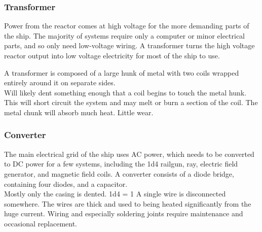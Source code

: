 \documentclass[a4paper]{article}
\begin{document}
\vspace{-0.5cm} \hspace{-18pt} \subsubsection{Transformer} \label{grid_transformer} \vspace{-0.2cm}
Power from the reactor comes at high voltage for the more demanding parts of the ship. The majority of systems require only a computer or minor electrical parts, and so only need low-voltage wiring. A transformer turns the high voltage reactor output into low voltage electricity for most of the ship to use.

A transformer is composed of a large hunk of metal with two coils wrapped entirely around it on separate sides. 
\\ \pbhw
{}
{Will likely dent something enough that a coil begins to touch the metal hunk. This will short circuit the system and may melt or burn a section of the coil.}
{The metal chunk will absorb much heat.}
{Little wear.}


\vspace{-0.5cm} \hspace{-18pt} \subsubsection{Converter} \label{grid_converter} \vspace{-0.2cm}
The main electrical grid of the ship uses AC power, which needs to be converted to DC power for a few systems, including the 1d4 railgun, ray, electric field generator, and magnetic field coils. A converter consists of a diode bridge, containing four diodes, and a capacitor. 
\\ \pbhw
{}
{Mostly only the casing is dented. \newline 1d4 = 1 A single wire is disconnected somewhere.}
{The wires are thick and used to being heated significantly from the huge current.}
{Wiring and especially soldering joints require maintenance and occasional replacement.}
\end{document}
